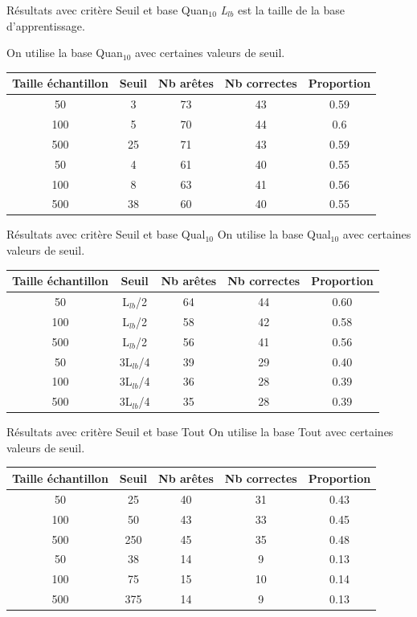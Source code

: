 \documentclass{beamer}
\begin{document}
\begin{frame}{Résultats avec critère Seuil et base Quan$_{10}$}
\emph{L$_{lb}$} est la taille de la base d'apprentissage. 


On utilise la base Quan$_{10}$ avec certaines valeurs de seuil.

\begin{tabular}{|c|c|c|c|c|}
   \hline
   Taille échantillon & Seuil & Nb arêtes & Nb correctes & Proportion\\
   \hline
   50 & 3 & 73 & 43 & 0.59  \\   
   \hline
   100 & 5 & 70 & 44 & 0.6  \\
   \hline
   500 & 25 & 71 & 43 & 0.59  \\
   \hline
   \hline
   50 & 4 & 61 & 40 & 0.55  \\
   \hline
   100 & 8 & 63 & 41 & 0.56  \\
   \hline
   500 & 38 & 60 & 40 & 0.55  \\
   \hline
\end{tabular}


\end{frame}

\begin{frame}{Résultats avec critère Seuil et base Qual$_{10}$}
On utilise la base Qual$_{10}$ avec certaines valeurs de seuil.
\begin{tabular}{|c|c|c|c|c|}
   \hline
   Taille échantillon & Seuil & Nb arêtes & Nb correctes & Proportion\\
    \hline
   50 & L$_{lb}$/2 & 64 & 44 & 0.60  \\
   \hline
   100 & L$_{lb}$/2 & 58 & 42 & 0.58  \\
   \hline
   500 & L$_{lb}$/2 & 56 & 41 & 0.56  \\
   \hline
   \hline
   50 & 3L$_{lb}$/4 & 39 & 29 & 0.40  \\
   \hline
   100 & 3L$_{lb}$/4 & 36 & 28 & 0.39  \\
   \hline
   500 & 3L$_{lb}$/4 & 35 & 28 & 0.39  \\
   \hline
\end{tabular}
\end{frame}

\begin{frame}{Résultats avec critère Seuil et base Tout}
On utilise la base Tout avec certaines valeurs de seuil.
\begin{tabular}{|c|c|c|c|c|}
   \hline
   Taille échantillon & Seuil & Nb arêtes & Nb correctes & Proportion\\
   \hline
   50 & 25 & 40 & 31 & 0.43  \\
   \hline
   100 & 50 & 43 & 33 & 0.45  \\
   \hline
   500 & 250 & 45 & 35 & 0.48  \\
   \hline
   \hline
   50 & 38 & 14 & 9 & 0.13  \\
   \hline
   100 & 75 & 15 & 10 & 0.14  \\
   \hline
   500 & 375 & 14 & 9 & 0.13  \\
   \hline
\end{tabular}
\end{frame}
\end{document}
